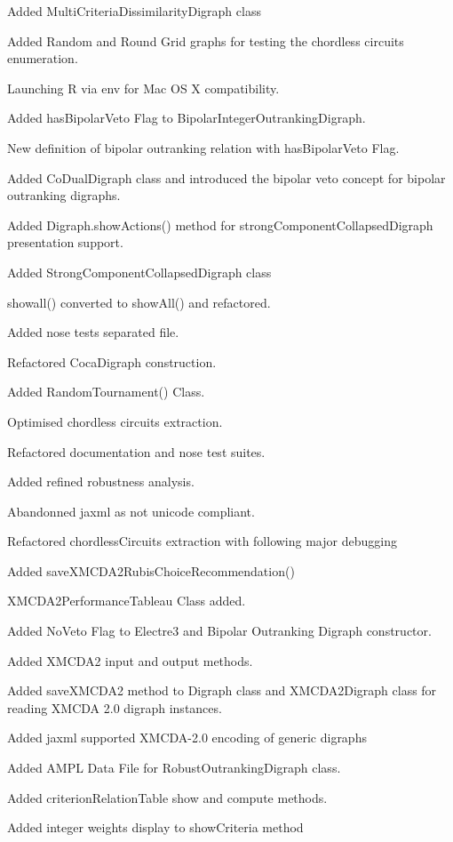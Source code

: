 \documentclass{article}
\newcommand{\+}{\verb+}
\renewcommand{\*}{\back{}}
\begin{document}
\begin{center}
\begin{menu}
\item Added MultiCriteriaDissimilarityDigraph class
\item Added Random and Round Grid graphs for testing the chordless circuits enumeration.
\item Launching R via env for Mac OS X compatibility.
\item Added hasBipolarVeto Flag to BipolarIntegerOutrankingDigraph.
\item New definition of bipolar outranking relation with hasBipolarVeto Flag.
\item Added CoDualDigraph class and introduced the bipolar veto concept for bipolar outranking digraphs.
\item Added Digraph.showActions() method for strongComponentCollapsedDigraph presentation support.
\item Added StrongComponentCollapsedDigraph class
\item showall() converted to showAll() and refactored.
\item Added nose tests separated file.
\item Refactored CocaDigraph construction.
\item Added RandomTournament() Class.
\item Optimised chordless circuits extraction.
\item Refactored documentation and nose test suites.
\item Added refined robustness analysis.
\item Abandonned jaxml as not unicode compliant.
\item Refactored chordlessCircuits extraction with following major debugging
\item Added saveXMCDA2RubisChoiceRecommendation()
\item XMCDA2PerformanceTableau Class added.
\item Added NoVeto Flag to Electre3 and Bipolar Outranking Digraph constructor.
\item Added XMCDA2 input and output methods.
\item Added saveXMCDA2 method to Digraph class and XMCDA2Digraph class for reading XMCDA 2.0 digraph instances.
\item Added jaxml supported XMCDA-2.0 encoding of generic digraphs
\item Added AMPL Data File for RobustOutrankingDigraph class.
\item Added criterionRelationTable show and compute methods.
\item Added integer weights display to showCriteria method

\end{menu}
\end{center}
\end{document}

